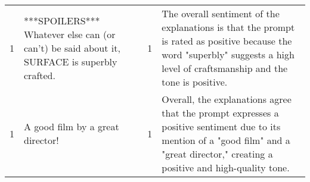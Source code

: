 \begin{tabular}{r{1cm} p{0.4in} r{1cm} p{0.4in}}
1 & ***SPOILERS*** Whatever else can (or can't) be said about it, SURFACE is superbly crafted. & 1 & The overall sentiment of the explanations is that the prompt is rated as positive because the word "superbly" suggests a high level of craftsmanship and the tone is positive. \\
1 & A good film by a great director! & 1 & Overall, the explanations agree that the prompt expresses a positive sentiment due to its mention of a "good film" and a "great director," creating a positive and high-quality tone. \\
\bottomrule
\end{tabular}
